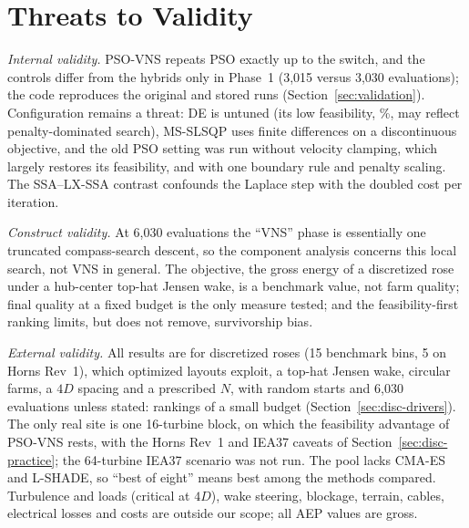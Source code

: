 \section{Threats to Validity}
\label{sec:limits}
\emph{Internal validity.} PSO-VNS repeats PSO exactly up to the switch, and the controls differ from the hybrids only in Phase~1 (3,015 versus 3,030 evaluations); the code reproduces the original and stored runs (Section~\ref{sec:validation}). Configuration remains a threat: DE is untuned (its low feasibility, \NFeasDE\%, may reflect penalty-dominated search), MS-SLSQP uses finite differences on a discontinuous objective, and the old PSO setting was run without velocity clamping, which largely restores its feasibility, and with one boundary rule and penalty scaling. The SSA--LX-SSA contrast confounds the Laplace step with the doubled cost per iteration.

\emph{Construct validity.} At 6,030 evaluations the ``VNS'' phase is essentially one truncated compass-search descent, so the component analysis concerns this local search, not VNS in general. The objective, the gross energy of a discretized rose under a hub-center top-hat Jensen wake, is a benchmark value, not farm quality; final quality at a fixed budget is the only measure tested; and the feasibility-first ranking limits, but does not remove, survivorship bias.

\emph{External validity.} All results are for discretized roses (15\textdegree{} benchmark bins, 5\textdegree{} on Horns Rev~1), which optimized layouts exploit, a top-hat Jensen wake, circular farms, a $4D$ spacing and a prescribed $N$, with random starts and 6,030 evaluations unless stated: rankings of a small budget (Section~\ref{sec:disc-drivers}). The only real site is one 16-turbine block, on which the feasibility advantage of PSO-VNS rests, with the Horns Rev~1 and IEA37 caveats of Section~\ref{sec:disc-practice}; the 64-turbine IEA37 scenario was not run. The pool lacks CMA-ES~\cite{HansenOstermeier2001} and L-SHADE, so ``best of eight'' means best among the methods compared. Turbulence and loads (critical at $4D$), wake steering, blockage, terrain, cables, electrical losses and costs are outside our scope; all AEP values are gross.

